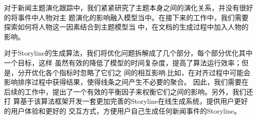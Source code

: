 对于新闻主题演化跟踪中，我们紧紧研究了主题本身之间的演化关系，并没有很好的将事件中人物对主
题演化的影响融入模型当中。在接下来的工作中，我们需要探索如何将人物这一因素结合到主题模型当
中，在文档的生成过程中加入人物的影响。

对于Storyline的生成算法，我们将优化问题拆解成了几个部分，每个部分优化其中一个目标，这样
虽然有效的降低了模型的时间复杂度，提高了算法运行效率；但是，分开优化各个指标时忽略了它们之
间的相互影响.比如，在对齐过程中可能会影响排序过程中获得结果，使得线条之间产生不必要的聚合。
因此，我们需要在后续的工作中，提出了一个有效的平衡因子来权衡它们之间的影响。另外，我们还打
算基于该算法框架开发一套更加完善的Storyline在线生成系统，提供用户更好的用户体验和更好的
交互方式，方便用户自己生成任何新闻事件的Storyline。